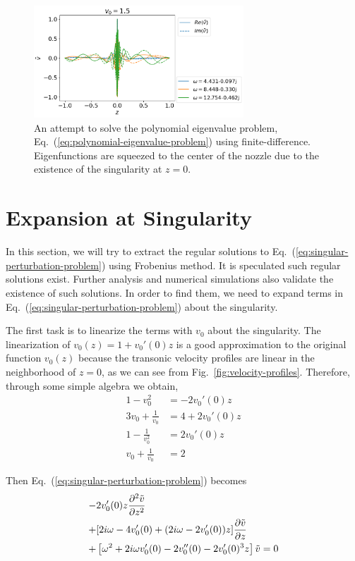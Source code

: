\begin{figure} [htbp]
	\centering
	\includegraphics[width=0.7\textwidth]{figures/results-bad-accelerating-v}
	\caption{An attempt to solve the polynomial eigenvalue problem, Eq.~(\ref{eq:polynomial-eigenvalue-problem}) using finite-difference. Eigenfunctions are squeezed to the center of the nozzle due to the existence of the singularity at $z=0$.}
	\label{fig:failure-of-spectral-method}
\end{figure}

\section{Expansion at Singularity}
In this section, we will try to extract the regular solutions to Eq.~(\ref{eq:singular-perturbation-problem}) using Frobenius method. It is speculated such regular solutions exist. Further analysis and numerical simulations also validate the existence of such solutions. In order to find them, we need to expand terms in Eq.~(\ref{eq:singular-perturbation-problem}) about the singularity.

The first task is to linearize the terms with $v_0$ about the singularity. The linearization of $v_0(z) = 1 + v_0'(0)z$ is a good approximation to the original function $v_0(z)$ because the transonic velocity profiles are linear in the neighborhood of $z=0$, as we can see from Fig.~\ref{fig:velocity-profiles}. Therefore, through some simple algebra we obtain,
\begin{equation}
	\begin{aligned}
		1-v_0^2              & = -2v_0'(0)z    \\
		3v_0 + \frac{1}{v_0} & = 4 + 2v_0'(0)z \\
		1-\frac{1}{v_0^2}    & = 2v_0'(0)z     \\
		v_0 + \frac{1}{v_0}  & = 2
	\end{aligned}
\end{equation}

Then Eq.~(\ref{eq:singular-perturbation-problem}) becomes
\begin{equation} \label{eq:perturbed-equation-full}
	\begin{aligned}
		- & 2v_0'(0)z\pdv[2]{\tilde{v}}{z}                                              \\
		+ & [2i\omega - 4v_0'(0) + (2i\omega - 2v_0'(0))z]\pdv{\tilde{v}}{z}            \\
		+ & \left[\omega^2 + 2i\omega v_0'(0) - 2v_0''(0) - 2v_0'(0)^3z\right]\tilde{v}
		= 0
	\end{aligned}
\end{equation}

